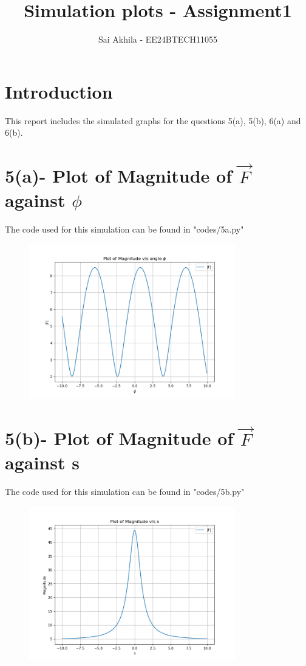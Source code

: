 \documentclass{article}
\title{Simulation plots - Assignment1}
\author{Sai Akhila - EE24BTECH11055}
\date{}
\begin{document}
\maketitle

\section{Introduction}
This report includes the simulated graphs for the questions 5(a), 5(b), 6(a) and 6(b). 

\section{5(a)- Plot of Magnitude of $\vec{F}$ against $\phi$}
The code used for this simulation can be found in "codes/5a.py"
\begin{figure}[H]
    \centering
    \includegraphics[width=0.8\textwidth]{figs/5a.png}
    \label{fig:|F|}
\end{figure}

\section{5(b)- Plot of Magnitude of $\vec{F}$ against s}
The code used for this simulation can be found in "codes/5b.py"
\begin{figure}[H]
    \centering
    \includegraphics[width=0.8\textwidth]{figs/5b.png}
    \label{fig:|F|}
\end{figure}
\end{document}
